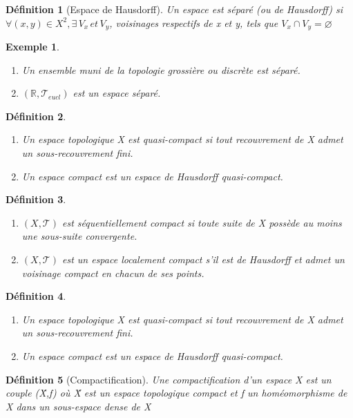 \documentclass{report}
\newtheorem{definition}{Définition}[section]
\theoremstyle{plain}
\newtheorem{exemple}{Exemple}[section]
\newcommand\T{\mathcal{T}}
\newcommand\R{\mathbb{R}}
\begin{document}
		\begin{definition}[Espace de Hausdorff]
			Un espace est séparé (ou de Hausdorff) si\\ $\forall (x,y )\in X^2, \exists\, V_x\, et\, V_y$, voisinages respectifs de x et y, tels que $V_x \cap V_y = \varnothing$
		\end{definition}

		\begin{exemple}
			\begin{enumerate}
				\item Un ensemble muni de la topologie grossière ou discrète est séparé.
				\item $(\R, \T_{eucl})$ est un espace séparé.
			\end{enumerate}
		\end{exemple}

		\begin{definition}
			\begin{enumerate}
				\item Un espace topologique X est quasi-compact si tout recouvrement de X admet un sous-recouvrement fini.
				\item Un espace compact est un espace de Hausdorff quasi-compact.
			\end{enumerate}
		\end{definition}
		
		\begin{definition}
			\begin{enumerate}
				\item $(X, \T)$ est séquentiellement compact si toute suite de X possède au moins une sous-suite convergente.
				\item $(X, \T)$ est un espace localement compact s'il est de Hausdorff et admet un voisinage compact en chacun de ses points.
			\end{enumerate}
		\end{definition}

		\begin{definition}
			\begin{enumerate}
				\item Un espace topologique X est quasi-compact si tout recouvrement de X admet un sous-recouvrement fini.
				\item Un espace compact est un espace de Hausdorff quasi-compact.
			\end{enumerate}
		\end{definition}

		\begin{definition}[Compactification]
			Une compactification d'un espace X est un couple (\^{X},f) où \^{X} est un espace topologique compact et f un homéomorphisme de X dans un sous-espace dense de X 
		\end{definition}
\end{document}
